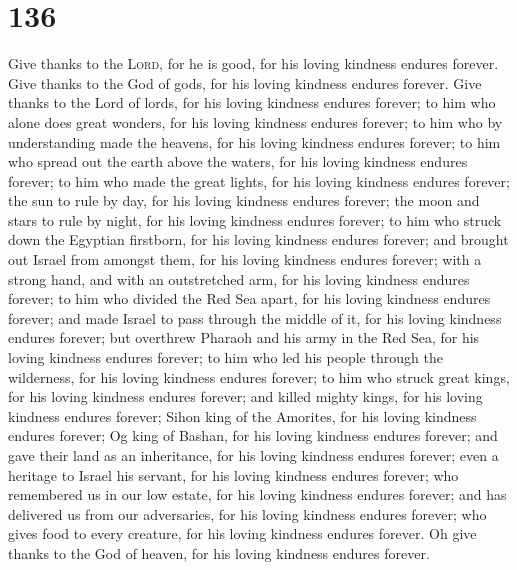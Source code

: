 \hypertarget{section-135}{%
\section{136}\label{section-135}}

 Give thanks to the \textsc{Lord}, for he is good, for his
loving kindness endures forever.  Give thanks to the God
of gods, for his loving kindness endures forever.  Give
thanks to the Lord of lords, for his loving kindness endures forever;
 to him who alone does great wonders, for his loving
kindness endures forever;  to him who by understanding
made the heavens, for his loving kindness endures forever;
 to him who spread out the earth above the waters, for his
loving kindness endures forever;  to him who made the
great lights, for his loving kindness endures forever; 
the sun to rule by day, for his loving kindness endures forever;
 the moon and stars to rule by night, for his loving
kindness endures forever;  to him who struck down the
Egyptian firstborn, for his loving kindness endures forever;
 and brought out Israel from amongst them, for his loving
kindness endures forever;  with a strong hand, and with
an outstretched arm, for his loving kindness endures forever;
 to him who divided the Red Sea apart, for his loving
kindness endures forever;  and made Israel to pass
through the middle of it, for his loving kindness endures forever;
 but overthrew Pharaoh and his army in the Red Sea, for
his loving kindness endures forever;  to him who led his
people through the wilderness, for his loving kindness endures forever;
 to him who struck great kings, for his loving kindness
endures forever;  and killed mighty kings, for his loving
kindness endures forever;  Sihon king of the Amorites,
for his loving kindness endures forever;  Og king of
Bashan, for his loving kindness endures forever;  and
gave their land as an inheritance, for his loving kindness endures
forever;  even a heritage to Israel his servant, for his
loving kindness endures forever;  who remembered us in
our low estate, for his loving kindness endures forever; 
and has delivered us from our adversaries, for his loving kindness
endures forever;  who gives food to every creature, for
his loving kindness endures forever.  Oh give thanks to
the God of heaven, for his loving kindness endures forever.

